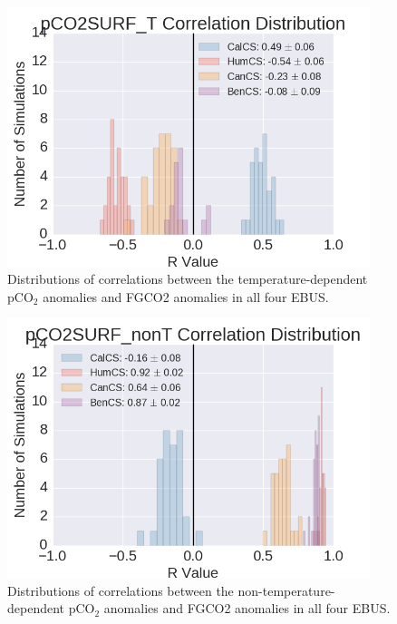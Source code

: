 \documentclass[12pt]{article}
\begin{document}
\clearpage
\begin{figure}[!h]
	\centering
	\includegraphics[width=25pc]{../../figs/all-systems/histograms/pCO2SURF_T-correlation-distributions.png}
	\caption{Distributions of correlations between the temperature-dependent pCO$_{2}$ anomalies and FGCO2 anomalies in all four EBUS.}
	\label{fig:pCO2-T-histograms}
\end{figure}
\begin{figure}[!h]
	\centering
	\includegraphics[width=25pc]{../../figs/all-systems/histograms/pCO2SURF_nonT-correlation-distributions.png}
	\caption{Distributions of correlations between the non-temperature-dependent pCO$_{2}$ anomalies and FGCO2 anomalies in all four EBUS.}
	\label{fig:pCO2-nonT-histograms}
\end{figure}
\end{document}
